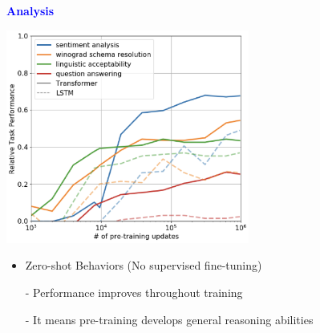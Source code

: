 \documentclass[professionalfont]{beamer}
\begin{document}
\begin{frame}

\begin{center}
    { \textbf{\textcolor{blue}{ {\fontsize{12}{14}\selectfont Analysis} }} }
\end{center}

\begin{center}
    \includegraphics[width=0.6\textwidth]{figure/2-2.png}
\end{center}

{\fontsize{10}{14}\selectfont 
\begin{itemize}
    \item Zero-shot Behaviors (No supervised fine-tuning)
    
    - Performance improves throughout training

    - It means pre-training develops general reasoning abilities

\end{itemize}
}

\end{frame}
\end{document}
